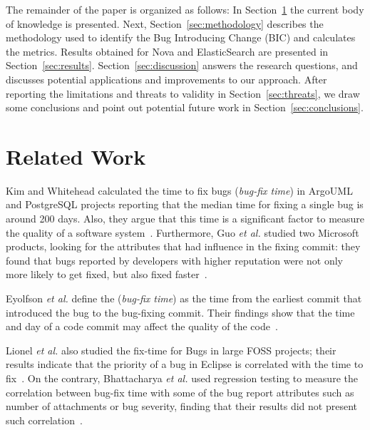 \documentclass[10pt, conference]{IEEEtran}
\begin{document}
The remainder of the paper is organized as follows: In Section~\ref{sec:relatedwork} the current body of knowledge is presented. Next, Section~\ref{sec:methodology} describes the methodology used to identify the Bug Introducing Change (BIC) and calculates the metrics. Results obtained for Nova and ElasticSearch are presented in Section~\ref{sec:results}. Section~\ref{sec:discussion} answers the research questions, and discusses potential applications and improvements to our approach. After reporting the limitations and threats to validity in Section~\ref{sec:threats}, we draw some conclusions and point out potential future work in Section~\ref{sec:conclusions}.

\section{Related Work}
\label{sec:relatedwork}


Kim and Whitehead calculated the time to fix bugs (\emph{bug-fix time}) in ArgoUML and PostgreSQL projects reporting that the median time for fixing a single bug is around 200 days. Also, they argue that this time is a significant factor to measure the quality of a software system~\cite{kim2006long}. Furthermore, Guo \emph{et al.} studied two Microsoft products, looking for the attributes that had influence in the fixing commit: they found that bugs reported by developers with higher reputation were not only more likely to get fixed, but also fixed faster~\cite{guo2010characterizing}.

Eyolfson \emph{et al.} define the (\emph{bug-fix time}) as the time from the earliest commit that introduced the bug to the bug-fixing commit. Their findings show that the time and day of a code commit may affect the quality of the code~\cite{eyolfson2011time}.

Lionel \emph{et al.} also studied the fix-time for Bugs in large FOSS projects; their results indicate that the priority of a bug in Eclipse is correlated with the time to fix~\cite{marks2011studying}. On the contrary, Bhattacharya \emph{et al.} used regression testing to measure the correlation between bug-fix time with some of the bug report attributes such as number of attachments or bug severity, finding that their results did not present such correlation~\cite{bhattacharya2011bug}.

\end{document}
